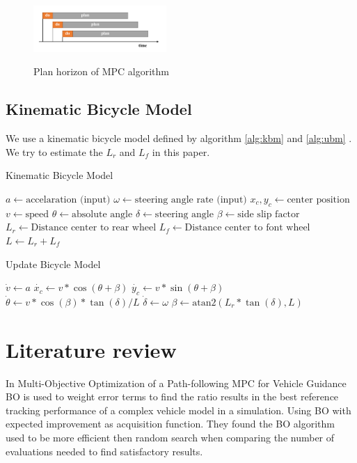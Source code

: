 \documentclass[twoside,twocolumn]{article}
\begin{document}
\begin{figure}[h]
    \caption{Plan horizon of MPC algorithm}
    \centering
    \includegraphics[width=0.45\textwidth]{fig_mpc_plan.pdf}
    \label{fig:mpc_plan}
\end{figure}

\subsection{Kinematic Bicycle Model}

We use a kinematic bicycle model defined by algorithm \ref{alg:kbm} and \ref{alg:ubm} \cite{kinematicBicycleModel}. We try to estimate the $L_r$ and $L_f$ in this paper.
\begin{algorithm}
    \caption{Kinematic Bicycle Model}
    \label{alg:kbm}
    \begin{algorithmic}
        \State $a \gets \text{accelaration (input)}$
        \State $\omega \gets \text{steering angle rate (input)}$
        \State $x_c, y_c \gets \text{center position}$
        \State $v \gets \text{speed}$
        \State $\theta \gets \text{absolute angle}$
        \State $\delta \gets \text{steering angle}$
        \State $\beta \gets \text{side slip factor}$
        \State $L_r \gets \text{Distance center to rear wheel}$
        \State $L_f \gets \text{Distance center to font wheel}$
        \State $L \gets L_r + L_f$
    \end{algorithmic}
\end{algorithm}

\begin{algorithm}
    \caption{Update Bicycle Model}
    \label{alg:ubm}
    \begin{algorithmic}[1]
        \State $\dot{v} \gets a$
        \State $\dot{x_c} \gets v * \cos{(\theta + \beta)}$
        \State $\dot{y_c} \gets v * \sin{(\theta + \beta)}$
        \State $\dot{\theta} \gets v * \cos{(\beta)} * \tan{(\delta)} / L$
        \State $\dot{\delta} \gets \omega$
        \State $\beta \gets \text{atan2}(L_r * \tan{(\delta)}, L)$
    \end{algorithmic}
\end{algorithm}

\section{Literature review}
In Multi-Objective Optimization of a Path-following MPC for Vehicle Guidance \cite{gharib2021multi} BO is used to weight error terms to find the ratio results in the best reference tracking performance of a complex vehicle model in a simulation. Using BO with expected improvement as acquisition function. They found the BO algorithm used to be more efficient then random search when comparing the number of evaluations needed to find satisfactory results.
\end{document}
